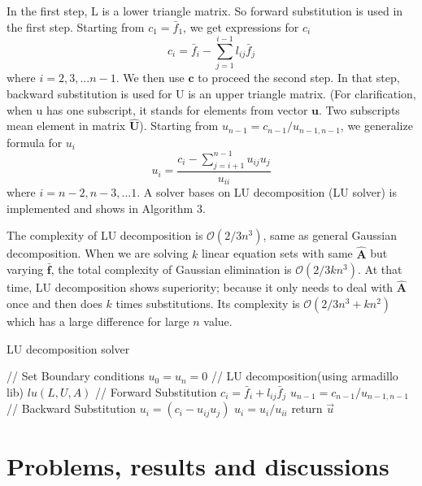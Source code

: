 \documentclass[12pt]{article}
\begin{document}
In the first step, L is a lower triangle matrix. So forward substitution is used in the first step. Starting from $c_1 = \bar{f}_1$, we get expressions for $c_i$
\begin{equation}
c_i = \bar{f}_i - \sum_{j=1}^{i-1}l_{ij}\bar{f}_j
\end{equation}
where $i = 2, 3, ...n-1$. We then use $\mathbf{c}$ to proceed the second step. In that step, backward substitution is used for U is an upper triangle matrix. (For clarification, when u has one subscript, it stands for elements from vector $\mathbf{u}$. Two subscripts mean element in matrix $\mathbf{\hat{U}}$). Starting from $u_{n-1} = c_{n-1}/u_{{n-1},{n-1}}$, we generalize formula for $u_i$
\begin{equation}
u_i = \frac{c_i - \sum_{j=i+1}^{n-1}u_{ij}u_j}{u_{ii}}
\end{equation}
where $i = n - 2, n - 3, ...1$. A solver bases on LU decomposition (LU solver) is implemented and shows in Algorithm 3\cite{sanderson2016armadillo}.

The complexity of LU decomposition is $\mathcal{O}(2/3n^3)$, same as general Gaussian decomposition. When we are solving $k$ linear equation sets with same $\mathbf{\hat{A}}$ but varying $\mathbf{\bar{f}}$, the total complexity of Gaussian elimination is $\mathcal{O}(2/3kn^3)$. At that time, LU decomposition shows superiority; because it only needs to deal with $\mathbf{\hat{A}}$ once and then does $k$ times substitutions. Its complexity is $\mathcal{O}(2/3n^3+kn^2)$ which has a large difference for large $n$ value.

\begin{algorithm}
\caption{LU decomposition solver}
// Set Boundary conditions\;
$u_0 = u_{n} = 0$\;
// LU decomposition(using armadillo lib)\;
$lu(L, U, A)$\;
// Forward Substitution\;
{
    {
     $c_i = \bar{f}_i + l_{ij}\bar{f}_j$\;
    }
}
$u_{n-1} = c_{n-1}/u_{n-1,n-1} $
// Backward Substitution\;
{
    {
     $u_i = (c_i - u_{ij}u_j)$\;
    }
  $u_i = u_i/u_{ii}$
}
return $\vec{u}$\;
\end{algorithm}


\section{Problems, results and discussions}
\end{document}

